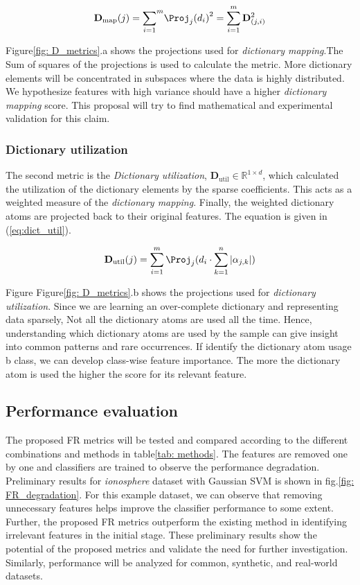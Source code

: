 \begin{equation}
    \label{eq:dict_map}
    \mathbf{D}_\textrm{map}(j)= {\sum_{i=1}}^m {\Proj_j(d_i)}^2  = \sum_{i=1}^m \mathbf{D}_{(j,i)}^2 
\end{equation}

Figure\ref{fig: D_metrics}.a shows the projections used for \textit{dictionary mapping}.The Sum of squares of the projections is used to calculate the metric. More dictionary elements will be concentrated in subspaces where the data is highly distributed. We hypothesize features with high variance should have a higher \textit{dictionary mapping} score. This proposal will try to find mathematical and experimental validation for this claim.

\subsubsection{Dictionary utilization}
 The second metric is the \textit{Dictionary utilization}, $\mathbf{D}_\textrm{util} \in \mathbb{R}^{1 \times d}$, which calculated the utilization of the dictionary elements by the sparse coefficients. This acts as a weighted measure of the \textit{dictionary mapping}. Finally, the weighted dictionary atoms are projected back to their original features. The equation is given in (\ref{eq:dict_util}).

 
 \begin{equation}
    \label{eq:dict_util}
    \mathbf{D}_\textrm{util}(j)= \sum_{i=1}^m \Proj_j(d_i \cdot \sum_{k=1}^n |\alpha_{j,k}|)  
\end{equation}

Figure Figure\ref{fig: D_metrics}.b shows the projections used for \textit{dictionary utilization}. Since we are learning an over-complete dictionary and representing data sparsely, Not all the dictionary atoms are used all the time. Hence, understanding which dictionary atoms are used by the sample can give insight into common patterns and rare occurrences. If identify the dictionary atom usage b class, we can develop class-wise feature importance. The more the dictionary atom is used the higher the score for its relevant feature.

\subsection{Performance evaluation}

The proposed FR metrics will be tested and compared according to the different combinations and methods in table\ref{tab: methods}. The features are removed one by one and classifiers are trained to observe the performance degradation. 
Preliminary results for \textit{ionosphere} dataset with Gaussian SVM is shown in fig.\ref{fig: FR_degradation}.  For this example dataset, we can observe that removing unnecessary features helps improve the classifier performance to some extent. Further, the proposed FR metrics outperform the existing method in identifying irrelevant features in the initial stage. These preliminary results show the potential of the proposed metrics and validate the need for further investigation. Similarly, performance will be analyzed for common, synthetic, and real-world datasets. 

